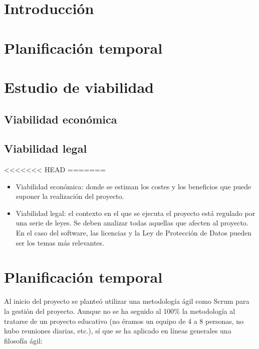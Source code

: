 
\section{Introducción}

\section{Planificación temporal}

\section{Estudio de viabilidad}

\subsection{Viabilidad económica}

\subsection{Viabilidad legal}


<<<<<<< HEAD
=======
\begin{itemize}
\tightlist
\item
  Viabilidad económica: donde se estiman los costes y los beneficios que
  puede suponer la realización del proyecto.
\item
  Viabilidad legal: el contexto en el que se ejecuta el proyecto está
  regulado por una serie de leyes. Se deben analizar todas aquellas que
  afecten al proyecto. En el caso del software, las licencias y la Ley
  de Protección de Datos pueden ser los temas más relevantes.
\end{itemize}

\section{Planificación temporal}\label{planificacion-temporal}

Al inicio del proyecto se planteó utilizar una metodología ágil como
Scrum para la gestión del proyecto. Aunque no se ha seguido al 100\% la
metodología al tratarse de un proyecto educativo (no éramos un equipo de
4 a 8 personas, no hubo reuniones diarias, etc.), sí que se ha aplicado
en líneas generales una filosofía ágil:

